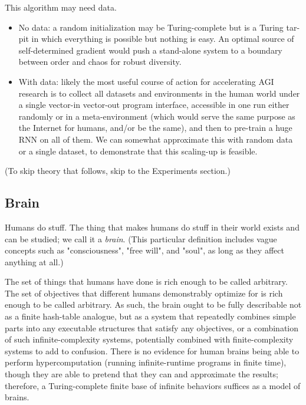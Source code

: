 \documentclass{article}
\begin{document}
This algorithm may need data.
\begin{itemize}
\item No data: a random initialization may be Turing-complete but is a Turing tar-pit \cite{10.1145/947955.1083808} in which everything is possible but nothing is easy. An optimal source of self-determined gradient would push a stand-alone system to a boundary between order and chaos \cite{feng2020optimal} for robust diversity.
\item With data: likely the most useful course of action for accelerating AGI research is to collect all datasets and environments in the human world under a single vector-in vector-out program interface, accessible in one run either randomly or in a meta-environment (which would serve the same purpose as the Internet for humans, and/or be the same), and then to pre-train a huge RNN on all of them. We can somewhat approximate this with random data or a single dataset, to demonstrate that this scaling-up is feasible.
\end{itemize}

(To skip theory that follows, skip to the Experiments section.)

\subsection{Brain}

Humans do stuff. The thing that makes humans do stuff in their world exists and can be studied; we call it a \textit{brain}. (This particular definition includes vague concepts such as "consciousness", "free will", and "soul", as long as they affect anything at all.)

The set of things that humans have done is rich enough to be called arbitrary. The set of objectives that different humans demonstrably optimize for is rich enough to be called arbitrary. As such, the brain ought to be fully describable not as a finite hash-table analogue, but as a system that repeatedly combines simple parts into any executable structures that satisfy any objectives, or a combination of such infinite-complexity systems, potentially combined with finite-complexity systems to add to confusion. There is no evidence for human brains being able to perform hypercomputation (running infinite-runtime programs in finite time), though they are able to pretend that they can and approximate the results; therefore, a Turing-complete finite base of infinite behaviors suffices as a model of brains.
\end{document}
